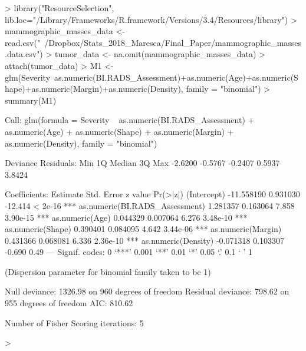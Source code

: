 \documentclass{article}
\begin{document}
\begin{Schunk}
\begin{Sinput}
> library("ResourceSelection", lib.loc="/Library/Frameworks/R.framework/Versions/3.4/Resources/library")
> mammographic_masses_data <- read.csv("~/Dropbox/Stats_2018_Maresca/Final_Paper/mammographic_masses.data.csv")
> tumor_data <- na.omit(mammographic_masses_data)
> attach(tumor_data)
> M1 <- glm(Severity~as.numeric(BI.RADS_Assessment)+as.numeric(Age)+as.numeric(Shape)+as.numeric(Margin)+as.numeric(Density), family = "binomial")
> summary(M1)
\end{Sinput}
\begin{Soutput}
Call:
glm(formula = Severity ~ as.numeric(BI.RADS_Assessment) + as.numeric(Age) + 
    as.numeric(Shape) + as.numeric(Margin) + as.numeric(Density), 
    family = "binomial")

Deviance Residuals: 
    Min       1Q   Median       3Q      Max  
-2.6200  -0.5767  -0.2407   0.5937   3.8424  

Coefficients:
                                 Estimate Std. Error z value Pr(>|z|)    
(Intercept)                    -11.558190   0.931030 -12.414  < 2e-16 ***
as.numeric(BI.RADS_Assessment)   1.281357   0.163064   7.858 3.90e-15 ***
as.numeric(Age)                  0.044329   0.007064   6.276 3.48e-10 ***
as.numeric(Shape)                0.390401   0.084095   4.642 3.44e-06 ***
as.numeric(Margin)               0.431366   0.068081   6.336 2.36e-10 ***
as.numeric(Density)             -0.071318   0.103307  -0.690     0.49    
---
Signif. codes:  0 ‘***’ 0.001 ‘**’ 0.01 ‘*’ 0.05 ‘.’ 0.1 ‘ ’ 1

(Dispersion parameter for binomial family taken to be 1)

    Null deviance: 1326.98  on 960  degrees of freedom
Residual deviance:  798.62  on 955  degrees of freedom
AIC: 810.62

Number of Fisher Scoring iterations: 5
\end{Soutput}
\begin{Sinput}
> 
\end{Sinput}
\end{Schunk}
\hfill \\
\end{document}
